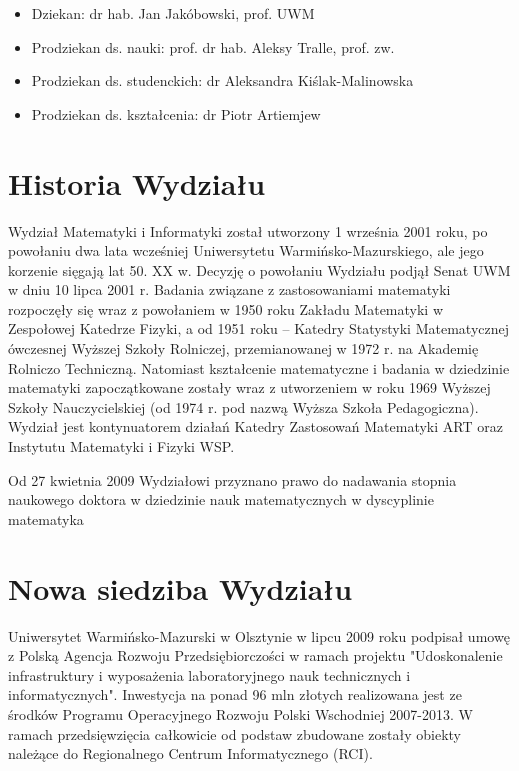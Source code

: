 ﻿\documentclass[a4paper,12pt]{article}
\begin{document}
\begin{itemize}
\item Dziekan: dr hab. Jan Jakóbowski, prof. UWM
\item Prodziekan ds. nauki: prof. dr hab. Aleksy Tralle, prof. zw.
\item Prodziekan ds. studenckich: dr Aleksandra Kiślak-Malinowska
\item Prodziekan ds. kształcenia: dr Piotr Artiemjew
\end{itemize}

\section { Historia Wydziału}

Wydział Matematyki i Informatyki został utworzony 1 września 2001 roku, po powołaniu dwa lata wcześniej
Uniwersytetu Warmińsko-Mazurskiego, ale jego korzenie sięgają lat 50. XX w. Decyzję o powołaniu Wydziału
podjął Senat UWM w dniu 10 lipca 2001 r. Badania związane z zastosowaniami matematyki rozpoczęły się
wraz z powołaniem w 1950 roku Zakładu Matematyki w Zespołowej Katedrze Fizyki, a od 1951 roku –
Katedry Statystyki Matematycznej ówczesnej Wyższej Szkoły Rolniczej, przemianowanej w 1972 r. na
Akademię Rolniczo Techniczną. Natomiast kształcenie matematyczne i badania w dziedzinie matematyki
zapoczątkowane zostały wraz z utworzeniem w roku 1969 Wyższej Szkoły Nauczycielskiej (od 1974 r. pod
nazwą Wyższa Szkoła Pedagogiczna). Wydział jest kontynuatorem działań Katedry Zastosowań Matematyki
ART oraz Instytutu Matematyki i Fizyki WSP.
\par

Od 27 kwietnia 2009 Wydziałowi przyznano prawo do nadawania stopnia naukowego doktora w dziedzinie
nauk matematycznych w dyscyplinie matematyka

\section { Nowa siedziba Wydziału}
Uniwersytet Warmińsko-Mazurski w Olsztynie w lipcu 2009 roku podpisał umowę z Polską Agencja Rozwoju
Przedsiębiorczości w ramach projektu "Udoskonalenie infrastruktury i wyposażenia laboratoryjnego nauk
technicznych i informatycznych". Inwestycja na ponad 96 mln złotych realizowana jest ze środków Programu
Operacyjnego Rozwoju Polski Wschodniej 2007-2013. W ramach przedsięwzięcia całkowicie od podstaw
zbudowane zostały obiekty należące do Regionalnego Centrum Informatycznego (RCI).
\par
\end{document}
